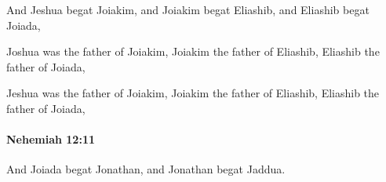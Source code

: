 			\begin{versebox}
					\item[BHS] 
					\item[LXX] 
					\item[ASV] And Jeshua begat Joiakim, and Joiakim begat Eliashib, and Eliashib begat Joiada,
					\item[NIV] Joshua was the father of Joiakim, Joiakim the father of Eliashib, Eliashib the father of Joiada,
					\item[NRSV] Jeshua was the father of Joiakim, Joiakim the father of Eliashib, Eliashib the father of Joiada,
			\end{versebox}

		\paragraph{Nehemiah 12:11} %
			\label{NEHEMIAH-12-11}

			And Joiada begat Jonathan, and Jonathan begat Jaddua.

